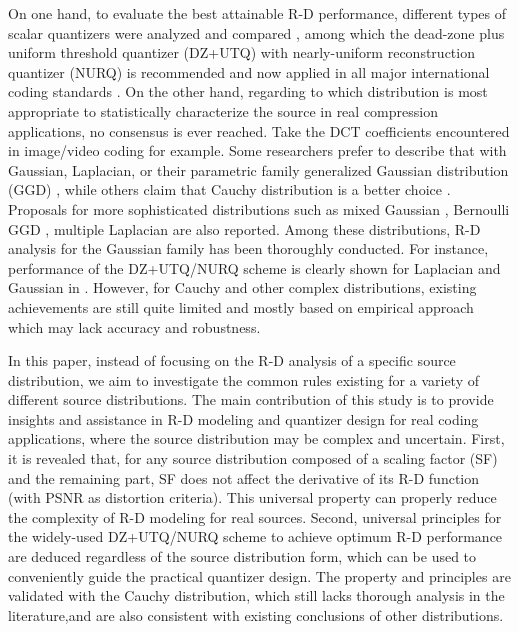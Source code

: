 \documentclass[smallabstract,smallcaptions]{dccpaper}
\begin{document}
On one hand, to evaluate the best attainable R-D performance, different types of scalar quantizers were analyzed and compared \cite{Sullivan_TIT1996}, among which the dead-zone plus uniform threshold quantizer (DZ+UTQ) with nearly-uniform reconstruction quantizer (NURQ) is recommended and now applied in all major international coding standards \cite{Sullivan_VCIP2005}. On the other hand, regarding to which distribution is most appropriate to statistically characterize the source in real compression applications, no consensus is ever reached. Take the DCT coefficients encountered in image/video coding for example. Some researchers prefer to describe that with Gaussian, Laplacian, or their parametric family generalized Gaussian distribution (GGD) \cite{Pratt_Wiley1978,Smooth_SPIE1996,Sun_TCSVT2009}, while others claim that Cauchy distribution is a better choice \cite{Kamaci_TCSVT2005}\cite{Rod_TCSVT2010}. Proposals for more sophisticated distributions such as mixed Gaussian \cite{Eude_ICASSP1994}, Bernoulli GGD \cite{Fraysse_TIT2009}, multiple Laplacian \cite{Lee_TCSVT2014} are also reported. Among these distributions, R-D analysis for the Gaussian family has been thoroughly conducted. For instance, performance of the DZ+UTQ/NURQ scheme is clearly shown for Laplacian and Gaussian in \cite{Sullivan_VCIP2005}. However, for Cauchy and other complex distributions, existing achievements are still quite limited and mostly based on empirical approach which may lack accuracy and robustness.

In this paper, instead of focusing on the R-D analysis of a specific source distribution, we aim to investigate the common rules existing for a variety of different source distributions. The main contribution of this study is to provide insights and assistance in R-D modeling and quantizer design for real coding applications, where the source distribution may be complex and uncertain. First, it is revealed that, for any source distribution composed of a scaling factor (SF) and the remaining part, SF does not affect the derivative of its R-D function (with PSNR as distortion criteria). This universal property can properly reduce the complexity of R-D modeling for real sources. Second, universal principles for the widely-used DZ+UTQ/NURQ scheme to achieve optimum R-D performance are deduced regardless of the source distribution form, which can be used to conveniently guide the practical quantizer design. The property and principles are validated with the Cauchy distribution, which still lacks thorough analysis in the literature,and are also consistent with existing conclusions of other distributions.
\end{document}
